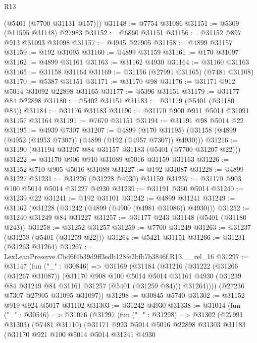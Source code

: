 \begin{lexlean}{R13}
\begin{coremodule}
      (@5401 (@7700 @31131 @157)))
@31148 := @7754 @31086
@31151 := @5309 (@11595 @31148) @27983
@31152 := @6860 @31151
@31156 := @31152 @897 @913 @31093 @31098
@31157 := @4945 @27905
@31158 := @4899 @31157
@31159 := @192 @31095
@31160 := @4899 @31159
@31161 := @170 @31097
@31162 := @4899 @31161
@31163 := @31162 @4930
@31164 := @31160 @31163
@31165 := @31158 @31164
@31169 := @31156 (@27991 @31165) (@7481 @31108)
@31170 := @5387 @31151
@31171 := @31170 @98
@31176 := @31171 @912 @5014 @31092 @22898 @31165
@31177 := @5396 @31151
@31179 := @31177 @84 @22898
@31180 := @5402 @31151
@31183 := @31179 (@5401 (@31180 @84))
@31184 := @31176 @31183
@31190 := @31170 @900 @911 @5014 @31091 @31157 @31164
@31191 := @7670 @31151
@31194 := @31191 @98 @5014 @22
@31195 := @4939 @7307
@31207 := @4899
    (@170 @31195)
    (@31158 (@4899 (@4952 (@4953 @7307)) (@4899 (@192 (@4957 @7307)) @4930)))
@31216 := @31190 (@31194 @31207 @84 @31157 @31183 (@5401 (@7700 @31207 @22)))
@31222 := @31170 @906 @910 @31089 @5016 @31159 @31163
@31226 := @31152 @710 @905 @5016 @31088
@31227 := @192 @31087
@31228 := @4899 @31227
@31231 := @31226 (@31228 @4930) @31159
@31237 := @31170 @903 @100 @5014 @5014 @31227 @4930
@31239 := @31191 @360 @5014
@31240 := @31239 @22
@31241 := @192 @31101
@31242 := @4899 @31241
@31249 := @31162 (@31228 (@31242 (@4899 (@4900 (@4981 @31086)) @4930)))
@31252 := @31240 @31249 @84 @31227
@31257 := @31177 @243 @31148 (@5401 (@31180 @243))
@31258 := @31252 @31257
@31259 := @7700 @31249
@31263 := @31237 (@31258 (@5401 (@31259 @22)))
@31264 := @5421 @31151
@31266 := @31231 (@31263 @31264)
@31267 := LexLeanPreserve.Cbd6f4b39d9ff3edb128fe2bfb7b3846f.R13.__rel_16
@31297 := @31147
    (fun ("_" : @30846) =>
    @31169
      (@31184
        (@31216
          (@31222
            (@31266 (@31267 @31087))
            (@31170
              @908
              @100
              @5014
              @5014
              @31161
              @4930
              (@31239 @84 @31249 @84 @31161 @31257 (@5401 (@31259 @84)))
              @31264))))
      (@27236 @7307 @27905 @31095 @31097))
@31298 := @30845 @5740
@31302 := @31152 @919 @924 @5017 @31102
@31303 := @31242 @4930
@31338 := @31014
    (fun ("_" : @30546) =>
    @31076
      (@31297
        (fun ("_" : @31298) =>
        @31302
          (@27991 @31303)
          (@7481 @31110)
          (@31171
            @923
            @5014
            @5016
            @22898
            @31303
            @31183
            (@31170
              @921
              @100
              @5014
              @5014
              @31241
              @4930

\end{coremodule}
\end{lexlean}
